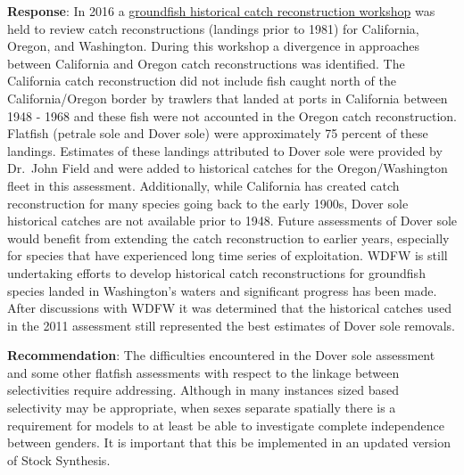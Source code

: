 \documentclass[11pt,
  english,
  a4paper,
]{article}
\begin{document}

\textbf{Response}: In 2016 a {\href{https://www.pcouncil.org/documents/2017/03/i2_att1_catch_reconstruction_workshop_report_mar2017bb.pdf/}{groundfish historical catch reconstruction workshop}\leavevmode\tagmcend\tagstructend} was held to review catch reconstructions (landings prior to 1981) for California, Oregon, and Washington. During this workshop a divergence in approaches between California and Oregon catch reconstructions was identified. The California catch reconstruction did not include fish caught north of the California/Oregon border by trawlers that landed at ports in California between 1948 - 1968 and these fish were not accounted in the Oregon catch reconstruction. Flatfish (petrale sole and Dover sole) were approximately 75 percent of these landings. Estimates of these landings attributed to Dover sole were provided by Dr.~John Field and were added to historical catches for the Oregon/Washington fleet in this assessment. Additionally, while California has created catch reconstruction for many species going back to the early 1900s, Dover sole historical catches are not available prior to 1948. Future assessments of Dover sole would benefit from extending the catch reconstruction to earlier years, especially for species that have experienced long time series of exploitation. WDFW is still undertaking efforts to develop historical catch reconstructions for groundfish species landed in Washington's waters and significant progress has been made. After discussions with WDFW it was determined that the historical catches used in the 2011 assessment still represented the best estimates of Dover sole removals.

\leavevmode\tagmcend\tagstructend\par


\textbf{Recommendation}: The difficulties encountered in the Dover sole assessment and some other flatfish assessments with respect to the linkage between selectivities require addressing. Although in many instances sized based selectivity may be appropriate, when sexes separate spatially there is a requirement for models to at least be able to investigate complete independence between genders. It is important that this be implemented in an updated version of Stock Synthesis.

\leavevmode\tagmcend\tagstructend\par
\end{document}
